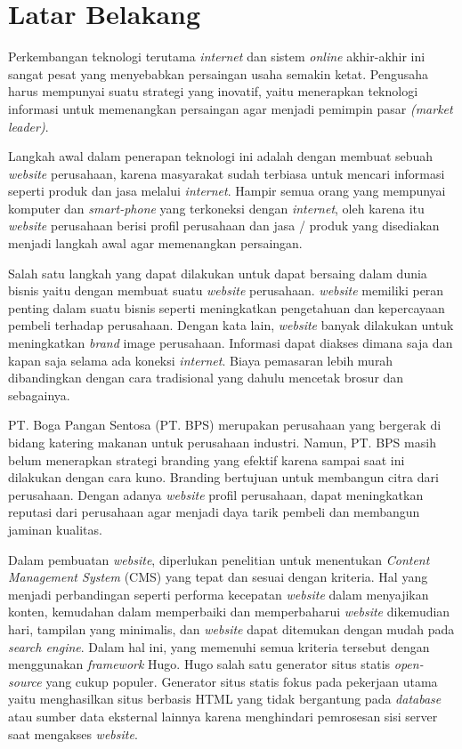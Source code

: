 

\section{Latar Belakang}

Perkembangan teknologi terutama \emph{internet} dan sistem \emph{online} akhir-akhir ini sangat pesat 
yang menyebabkan persaingan usaha semakin ketat. Pengusaha harus mempunyai suatu strategi yang inovatif, 
yaitu menerapkan teknologi informasi untuk memenangkan persaingan agar menjadi pemimpin pasar \emph{(market leader)}.

Langkah awal dalam penerapan teknologi ini adalah dengan membuat sebuah \emph{website} perusahaan, 
karena masyarakat sudah terbiasa untuk mencari informasi seperti produk dan jasa melalui \emph{internet}. 
Hampir semua orang yang mempunyai komputer dan \emph{smart-phone} yang terkoneksi dengan \emph{internet}, oleh karena itu 
\emph{website} perusahaan berisi profil perusahaan dan jasa / produk yang disediakan 
menjadi langkah awal agar memenangkan persaingan.

Salah satu langkah yang dapat dilakukan untuk dapat bersaing dalam dunia bisnis yaitu dengan membuat suatu \emph{website} perusahaan. 
\emph{website} memiliki peran penting dalam suatu bisnis 
seperti meningkatkan pengetahuan dan kepercayaan pembeli terhadap perusahaan. 
Dengan kata lain, \emph{website} banyak dilakukan untuk meningkatkan \emph{brand} image perusahaan. 
Informasi dapat diakses dimana saja dan kapan saja  selama ada koneksi \emph{internet}. 
Biaya pemasaran lebih murah dibandingkan dengan cara tradisional yang dahulu mencetak brosur dan sebagainya.

PT. Boga Pangan Sentosa (PT. BPS) merupakan perusahaan yang bergerak di bidang katering makanan untuk perusahaan industri. 
Namun, PT. BPS masih belum menerapkan strategi branding yang efektif karena sampai saat ini dilakukan dengan cara kuno. 
Branding bertujuan untuk membangun citra dari perusahaan. Dengan adanya \emph{website} profil perusahaan, 
dapat meningkatkan reputasi dari perusahaan agar menjadi daya tarik pembeli dan membangun jaminan kualitas.

Dalam pembuatan \emph{website}, diperlukan penelitian untuk menentukan \emph{Content Management System} (CMS) 
yang tepat dan sesuai dengan kriteria. Hal yang menjadi perbandingan seperti performa kecepatan \emph{website} 
dalam menyajikan konten, kemudahan dalam memperbaiki dan memperbaharui \emph{website} dikemudian hari, 
tampilan yang minimalis, dan \emph{website} dapat ditemukan dengan mudah pada \emph{search engine}. 
Dalam hal ini, yang memenuhi semua kriteria tersebut dengan menggunakan \emph{framework} Hugo. 
Hugo salah satu generator situs statis \emph{open-source} yang cukup populer.  
Generator situs statis fokus pada pekerjaan utama yaitu menghasilkan situs berbasis HTML
yang tidak bergantung pada \emph{database} atau sumber data eksternal lainnya karena menghindari 
pemrosesan sisi server saat mengakses \emph{website}.


